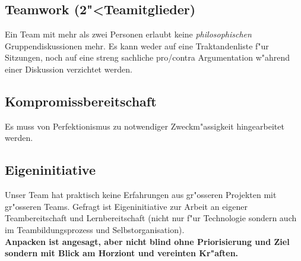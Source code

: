 \documentclass[10pt]{report}
\begin{document}
\subsection{Teamwork (2"<Teamitglieder)}
Ein Team mit mehr als zwei Personen erlaubt keine \textit{philosophischen}  Gruppendiskussionen mehr.
Es kann weder auf eine Traktandenliste f"ur Sitzungen, noch auf eine streng sachliche pro/contra
Argumentation w"ahrend einer Diskussion verzichtet werden.

\subsection{Kompromissbereitschaft}
Es muss von Perfektionismus zu notwendiger Zweckm"assigkeit hingearbeitet werden.

\subsection{Eigeninitiative}
Unser Team hat praktisch keine Erfahrungen aus gr"osseren Projekten mit gr"osseren Teams.
Gefragt ist Eigeninitiative zur Arbeit an eigener Teambereitschaft und Lernbereitschaft (nicht
nur f"ur Technologie sondern auch im Teambildungsprozess und Selbstorganisation).
\\
\textbf{Anpacken ist angesagt, aber nicht blind ohne Priorisierung und Ziel sondern
        mit Blick am Horziont und vereinten Kr"aften.
        }
\end{document}
